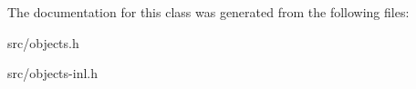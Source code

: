 The documentation for this class was generated from the following files\+:\begin{DoxyCompactItemize}
\item 
src/objects.\+h\item 
src/objects-\/inl.\+h\end{DoxyCompactItemize}

